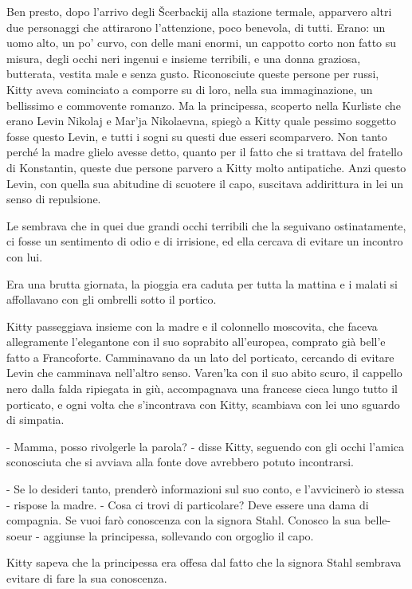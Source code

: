 Ben presto, dopo l'arrivo degli Šcerbackij alla stazione termale, apparvero altri due personaggi che attirarono l'attenzione, poco benevola, di tutti. Erano: un uomo alto, un po' curvo, con delle mani enormi, un cappotto corto non fatto su misura, degli occhi neri ingenui e insieme terribili, e una donna graziosa, butterata, vestita male e senza gusto. Riconosciute queste persone per russi, Kitty aveva cominciato a comporre su di loro, nella sua immaginazione, un bellissimo e commovente romanzo. Ma la principessa, scoperto nella Kurliste che erano Levin Nikolaj e Mar'ja Nikolaevna, spiegò a Kitty quale pessimo soggetto fosse questo Levin, e tutti i sogni su questi due esseri scomparvero. Non tanto perché la madre glielo avesse detto, quanto per il fatto che si trattava del fratello di Konstantin, queste due persone parvero a Kitty molto antipatiche. Anzi questo Levin, con quella sua abitudine di scuotere il capo, suscitava addirittura in lei un senso di repulsione. 

Le sembrava che in quei due grandi occhi terribili che la seguivano ostinatamente, ci fosse un sentimento di odio e di irrisione, ed ella cercava di evitare un incontro con lui. 

\label{xxxi-1} 

Era una brutta giornata, la pioggia era caduta per tutta la mattina e i malati si affollavano con gli ombrelli sotto il portico. 

Kitty passeggiava insieme con la madre e il colonnello moscovita, che faceva allegramente l'elegantone con il suo soprabito all'europea, comprato già bell'e fatto a Francoforte. Camminavano da un lato del porticato, cercando di evitare Levin che camminava nell'altro senso. Varen'ka con il suo abito scuro, il cappello nero dalla falda ripiegata in giù, accompagnava una francese cieca lungo tutto il porticato, e ogni volta che s'incontrava con Kitty, scambiava con lei uno sguardo di simpatia. 

- Mamma, posso rivolgerle la parola? - disse Kitty, seguendo con gli occhi l'amica sconosciuta che si avviava alla fonte dove avrebbero potuto incontrarsi. 

- Se lo desideri tanto, prenderò informazioni sul suo conto, e l'avvicinerò io stessa - rispose la madre. - Cosa ci trovi di particolare? Deve essere una dama di compagnia. Se vuoi farò conoscenza con la signora Stahl. Conosco la sua belle-soeur - aggiunse la principessa, sollevando con orgoglio il capo. 

Kitty sapeva che la principessa era offesa dal fatto che la signora Stahl sembrava evitare di fare la sua conoscenza. 

